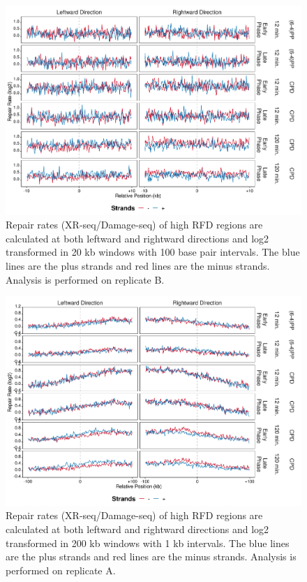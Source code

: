 \begin{figure}[H]
\begin{center}
\includegraphics[width=\textwidth]{Chapters/7_appendix/figures/supfig63}
\caption[Repair rate of high RFDs in 20 kb (replicate B).]{Repair rates (XR-seq/Damage-seq) of high RFD regions are calculated at both leftward and rightward directions and log2 transformed in 20 kb windows with 100 base pair intervals. The blue lines are the plus strands and red lines are the minus strands. Analysis is performed on replicate B.}
\label{supfig:rr20rfdB}
\end{center}
\end{figure}

\begin{figure}[H]
\begin{center}
\includegraphics[width=\textwidth]{Chapters/7_appendix/figures/supfig64}
\caption[Repair rate of high RFDs in 200 kb (replicate A).]{Repair rates (XR-seq/Damage-seq) of high RFD regions are calculated at both leftward and rightward directions and log2 transformed in 200 kb windows with 1 kb intervals. The blue lines are the plus strands and red lines are the minus strands. Analysis is performed on replicate A.}
\label{supfig:rr200rfdA}
\end{center}
\end{figure}

